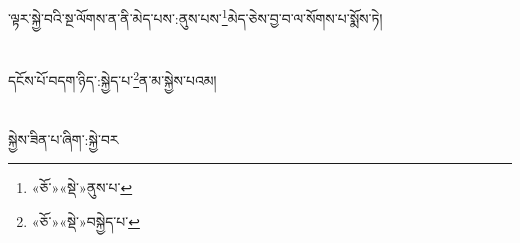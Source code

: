 ་ལྟར་སྐྱེ་བའི་སྔ་ལོགས་ན་ནི་མེད་པས་:ནུས་པས་\footnote{«ཅོ་»«སྡེ་»ནུས་པ་}མེད་ཅེས་བྱ་བ་ལ་སོགས་པ་སྨོས་ཏེ།\chapter{ }དངོས་པོ་བདག་ཉིད་:སྐྱེད་པ་\footnote{«ཅོ་»«སྡེ་»བསྐྱེད་པ་}ན་མ་སྐྱེས་པའམ།\chapter{ }སྐྱེས་ཟིན་པ་ཞིག་:སྐྱེ་བར